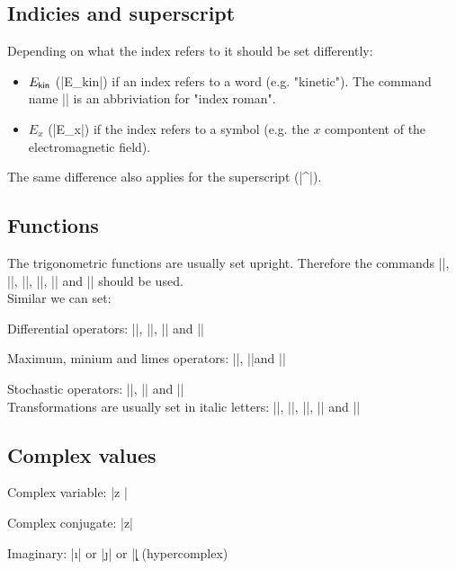 \documentclass[english]{latex4ei/latex4ei_sheet}
\begin{document}
\begin{sectionbox}
	\subsection{Indicies and superscript}
		Depending on what the index refers to it should be set differently:
		\begin{itemize}
			\item $E_{\sf kin}$ (\code|E_{\ir kin}|) if an index refers to a word (e.g. "kinetic"). The command name \code|\ir| is an abbriviation for  "index roman".
			\item $E_x$ (\code|E_x|) if the index refers to a symbol (e.g. the $x$ compontent of the electromagnetic field). \\
		\end{itemize}

		The same difference also applies for the superscript (\code|^|).
\end{sectionbox}

\begin{sectionbox}
	\subsection{Functions}
		The trigonometric functions are usually set upright. Therefore the commands \code|\exp|, \code|\sin|, \code|\cos|, \code|\sinh|, \code|\cosh| and \code|\sinc| should be used. \\

		Similar we can set: 

		Differential operators:  \code|\grad|, \code|\div|, \code|\rot| and \code|\lpo|

		Maximum, minium and limes operators: \code|\min|, \code|\max|and \code|\lim|				

		Stochastic operators: \code|\E|, \code|\Var| and \code|\Cov| \\

		Transformations are usually set in italic letters: \code|\FT|, \code|\LT|, \code|\DFT|, \code|\ZT| and \code|\DTFT|
\end{sectionbox}

\begin{sectionbox}
	\subsection{Complex values}

		Complex variable: \code|\cx z	|	

		Complex conjugate: \code|\cxc z|

		Imaginary: \code|\i| or \code|\j| or \code|\k| 	(hypercomplex)

\end{sectionbox}
\end{document}
